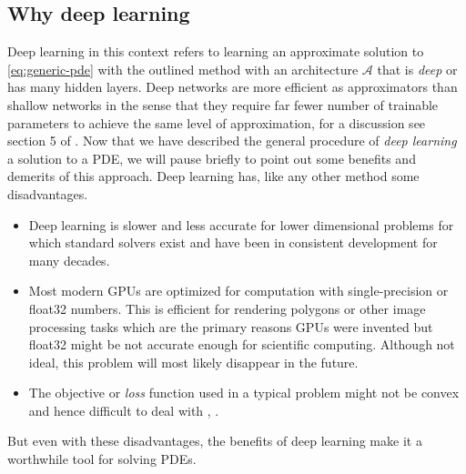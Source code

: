 \subsection{Why deep learning}
Deep learning in this context refers to learning an approximate solution to \eqref{eq:generic-pde} with the outlined method with an architecture $\mathcal A$ that is \textit{deep} or has many hidden layers. Deep networks are more efficient as approximators than shallow networks in the sense that they require far fewer number of trainable parameters to achieve the same level of approximation, for a discussion see section 5 of \cite{holstermann2023expressive}. Now that we have described the general procedure of \textit{deep learning} a solution to a PDE, we will pause briefly to point out some benefits and demerits of this approach. Deep learning has, like any other method some disadvantages. 
\begin{itemize}
    \item Deep learning is slower and less accurate for lower dimensional problems for which standard solvers exist and have been in consistent development for many decades. 
    \item Most modern GPUs are optimized for computation with single-precision or float32 numbers. This is efficient for rendering polygons or other image processing tasks which are the primary reasons GPUs were invented \cite{peddie2023history} but float32 might be not accurate enough for scientific computing. Although not ideal, this problem will most likely disappear in the future.
    \item The objective or \textit{loss} function used in a typical problem might not be convex and hence difficult to deal with \cite{krishnapriyan2021characterizing}, \cite{basir2022investigating}. 
\end{itemize}
But even with these disadvantages, the benefits of deep learning make it a worthwhile tool for solving PDEs.
